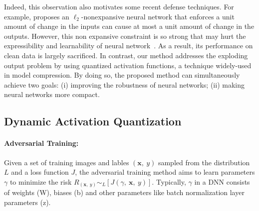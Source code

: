 \documentclass{article}
\def \x{\mathbf{x}}
\begin{document}
Indeed, this observation also  motivates some recent defense techniques. For example, \cite{qian2018l2} proposes an $\ell_2$-nonexpansive neural network that enforces a unit amount of change in the inputs can cause at most a unit amount of change in the outputs. However, this non expansive constraint is so strong that may hurt the expressibility and learnability of neural network~\cite{lin2017does}. As a result, its performance on clean data is largely sacrificed. In contrast, our method addresses the exploding output problem by using quantized activation functions, a technique widely-used in model compression. By doing so, the proposed method can simultaneously achieve two goals: (i) improving the robustness of neural networks; (ii) making neural networks more compact. 

\subsection{Dynamic Activation Quantization}

\paragraph{Adversarial Training:}


Given a set of training images and lables $(\x,\ y)$ sampled from the distribution $L$ and a loss function $J$, the adversarial training method aims to learn parameters $\gamma$ to minimize the risk $R_{(\x,\ y)}\sim_L[J(\gamma,\ \x,\ y)]$. Typically,  $\gamma$ in a DNN consists of weights (W), biases (b) and other parameters like batch normalization layer parameters (z).
\end{document}
